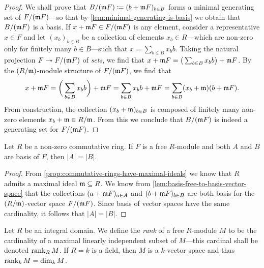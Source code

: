 \begin{proof}
    We shall prove that \(B/(\mathfrak{m} F) \coloneq (b + \mathfrak{m} F)_{b \in B}\)
    forms a minimal generating set of \(F/(\mathfrak{m} F)\)---so that by
    \cref{lem:minimal-generating-is-basis} we obtain that \(B/(\mathfrak{m} F)\) is a
    basis. If \(x + \mathfrak{m} F \in F/(\mathfrak{m} F)\) is any element, consider a
    representative \(x \in F\) and let \((x_b)_{b \in B}\) be a collection of
    elements \(x_b \in R\)---which are non-zero only for finitely many
    \(b \in B\)---such that \(x = \sum_{b \in B} x_b b\). Taking the natural
    projection \(F \twoheadrightarrow F/(\mathfrak{m} F)\) of \emph{sets}, we find that
    \(x + \mathfrak{m} F = \big( \sum_{b \in B} x_b b \big) + \mathfrak{m} F\). By the
    \((R/\mathfrak{m})\)-module structure of \(F/(\mathfrak{m} F)\), we find that
    \[
        x + \mathfrak{m} F
        = \bigg( \sum_{b \in B} x_b b \bigg) + \mathfrak{m} F
        = \sum_{b \in B} x_b b + \mathfrak{m} F
        = \sum_{b \in B} (x_b + \mathfrak{m}) (b + \mathfrak{m} F).
    \]
    From construction, the collection \((x_b + \mathfrak{m})_{b \in B}\) is composed of
    finitely many non-zero elements \(x_b + \mathfrak{m} \in R/\mathfrak{m}\). From this we
    conclude that \(B/(\mathfrak{m} F)\) is indeed a generating set for
    \(F/(\mathfrak{m} F)\).

\end{proof}

\begin{proposition}
    \label{prop:comm-ring-basis-have-same-cardinality}
    Let \(R\) be a non-zero commutative ring. If \(F\) is a free \(R\)-module and
    both \(A\) and \(B\) are basis of \(F\), then \(|A| = |B|\).
\end{proposition}

\begin{proof}
    From \cref{prop:commutative-rings-have-maximal-ideals} we know that \(R\) admits
    a maximal ideal \(\mathfrak{m} \subseteq R\). We know from
    \cref{lem:basis-free-to-basis-vector-space} that the collections \((a + \mathfrak{m}
    F)_{a \in A}\) and \((b + \mathfrak{m} F)_{b \in B}\) are both basis for the
    \((R/\mathfrak{m})\)-vector space \(F/(\mathfrak{m} F)\). Since basis of vector spaces
    have the same cardinality, it follows that \(|A| = |B|\).
\end{proof}

\begin{definition}[Rank]
    \label{def:rank-of-module}
    Let \(R\) be an integral domain. We define the \emph{rank} of a free
    \(R\)-module \(M\) to be the cardinality of a maximal linearly independent
    subset of \(M\)---this cardinal shall be denoted \(\operatorname{rank}_R M\). If \(R = k\) is a
    field, then \(M\) is a \(k\)-vector space and thus \(\operatorname{rank}_k M = \dim_k M\).
\end{definition}

